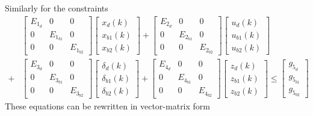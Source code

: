 Similarly for the constraints
\begin{align*}
    &\begin{bmatrix} E_{1_{d}} & 0 & 0\\ 0 & E_{1_{b1}} & 0\\ 0 & 0 & E_{1_{b2}}\end{bmatrix}
    \begin{bmatrix} x_d(k)\\ x_{b1}(k)\\x_{b2}(k)\end{bmatrix}
    + \begin{bmatrix} E_{2_{d}} & 0 & 0\\ 0 & E_{2_{b1}} & 0\\ 0 & 0 & E_{2_{b2}}\end{bmatrix}\begin{bmatrix} u_d(k)\\ u_{b1}(k)\\u_{b2}(k)\end{bmatrix} \\
    + &\begin{bmatrix} E_{3_{d}} & 0 & 0\\ 0 & E_{3_{b1}} & 0\\ 0 & 0 & E_{3_{b2}}\end{bmatrix}\begin{bmatrix} \delta_d(k)\\ \delta_{b1}(k)\\\delta_{b2}(k)\end{bmatrix}
    + \begin{bmatrix} E_{4_{d}} & 0 & 0\\ 0 & E_{4_{b1}} & 0\\ 0 & 0 & E_{4_{b2}}\end{bmatrix}\begin{bmatrix} z_d(k)\\ z_{b1}(k)\\z_{b2}(k)\end{bmatrix} 
    \leq \begin{bmatrix} g_{5_{d}}\\ g_{5_{b1}}\\g_{5_{b2}}\end{bmatrix}
\end{align*}
These equations can be rewritten in vector-matrix form
\setcounter{MaxMatrixCols}{20}
